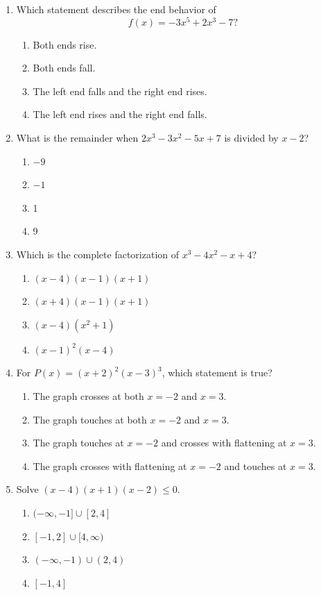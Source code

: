 \documentclass[12pt]{article}
\begin{document}
\begin{enumerate}[leftmargin=*,itemsep=1.1em]
  \item Which statement describes the end behavior of
  \[
    f(x)=-3x^5+2x^3-7?
  \]
  \begin{enumerate}[label=\Alph*.,itemsep=0pt]
    \item Both ends rise.
    \item Both ends fall.
    \item The left end falls and the right end rises.
    \item The left end rises and the right end falls.
  \end{enumerate}

  \item What is the remainder when $2x^3-3x^2-5x+7$ is divided by $x-2$?
  \begin{enumerate}[label=\Alph*.,itemsep=0pt]
    \item $-9$ \item $-1$ \item 1 \item 9
  \end{enumerate}

  \item Which is the complete factorization of $x^3-4x^2-x+4$?
  \begin{enumerate}[label=\Alph*.,itemsep=0pt]
    \item $(x-4)(x-1)(x+1)$
    \item $(x+4)(x-1)(x+1)$
    \item $(x-4)(x^2+1)$
    \item $(x-1)^2(x-4)$
  \end{enumerate}

  \item For $P(x)=(x+2)^2(x-3)^3$, which statement is true?
  \begin{enumerate}[label=\Alph*.,itemsep=0pt]
    \item The graph crosses at both $x=-2$ and $x=3$.
    \item The graph touches at both $x=-2$ and $x=3$.
    \item The graph touches at $x=-2$ and crosses with flattening at $x=3$.
    \item The graph crosses with flattening at $x=-2$ and touches at $x=3$.
  \end{enumerate}

  \item Solve $(x-4)(x+1)(x-2)\le0$.
  \begin{enumerate}[label=\Alph*.,itemsep=0pt]
    \item $(-\infty,-1]\cup[2,4]$
    \item $[-1,2]\cup[4,\infty)$
    \item $(-\infty,-1)\cup(2,4)$
    \item $[-1,4]$
  \end{enumerate}


\end{enumerate}
\end{document}
